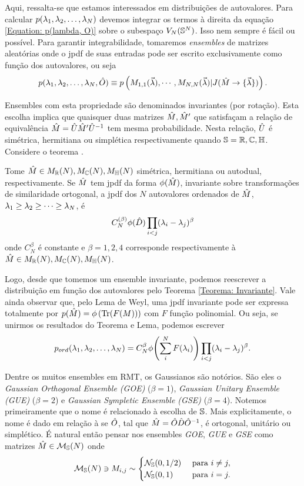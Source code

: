 \documentclass[12pt]{report}
\begin{document}
Aqui, ressalta-se que estamos interessados em distribuições de autovalores. Para calcular $p(\lambda_1, \lambda_2, \dots, \lambda_N)$ devemos integrar os termos à direita da equação \ref{Equation: p(lambda, O)} sobre o subespaço $V_N(\mathbb{S}^N)$. Isso nem sempre é fácil ou possível. Para garantir integrabilidade, tomaremos \textit{ensembles} de matrizes aleatórias onde o jpdf de suas entradas pode ser escrito exclusivamente como função dos autovalores, ou seja $$p(\lambda_1, \lambda_2, \dots, \lambda_N, \hat O) \equiv p \left( M_{1,1}(\vec{\lambda}), \cdots, M_{N,N}(\vec{\lambda}) | J(\hat M \rightarrow \{ \vec{\lambda} \} ) \right).$$

Ensembles com esta propriedade são denominados invariantes (por rotação). Esta escolha implica que quaisquer duas matrizes $\hat M, \hat M'$ que satisfaçam a relação de equivalência $\hat M = \hat U \hat M' \hat U^{-1}$ tem mesma probabilidade. Nesta relação, $\hat U$ é simétrica, hermitiana ou simplética respectivamente quando $\mathbb{S} = \mathbb{R},\mathbb{C},\mathbb{H} $. Considere o teorema \cite[Capítulo~3]{AlanThesis}.
\begin{thm}
	Tome $\hat M \in M_{\mathbb{R}}(N),  M_{\mathbb{C}}(N),  M_{\mathbb{H}}(N)$ simétrica, hermitiana ou autodual, respectivamente. Se  $\hat M$ tem jpdf da forma $\phi(\hat M)$, invariante sobre transformações de similaridade ortogonal, a jpdf dos $N$ autovalores ordenados de $\hat M$, $\lambda_1 \geq \lambda_2 \geq \dots \geq \lambda_N$, é $$ C_{N}^{(\beta)} \phi(\hat D) \prod_{i < j} (\lambda_i - \lambda_j)^{\beta}$$ onde $C_{N}^{\beta}$ é constante e $\beta = 1, 2, 4$ corresponde respectivamente à $\hat M \in M_{\mathbb{R}}(N),  M_{\mathbb{C}}(N),  M_{\mathbb{H}}(N)$. 
	\label{Teorema: Invariante}
\end{thm}
Logo, desde que tomemos um ensemble invariante, podemos reescrever a distribuição em função dos autovalores pelo Teorema \ref{Teorema: Invariante}. Vale ainda observar que, pelo Lema de Weyl, uma jpdf invariante pode ser expressa totalmente por $p(\hat M)= \phi \left(\operatorname{Tr}(F(M)) \right)$ com $F$ função polinomial. Ou seja, se unirmos os resultados do Teorema e Lema, podemos escrever
\begin{equation}
	p_{ord}(\lambda_1, \lambda_2, \dots, \lambda_N) = C_{N}^{\beta} \phi{\left( \sum_i^N F(\lambda_i) \right)} \prod_{i < j} (\lambda_i - \lambda_j)^{\beta}.
	\label{Equation: p-ord}
\end{equation}

Dentre os muitos ensembles em RMT, os Gaussianos são notórios. São eles o \textit{Gaussian Orthogonal Ensemble (GOE)} ($\beta=1$), \textit{Gaussian Unitary Ensemble (GUE)} ($\beta=2$) e \textit{Gaussian Sympletic Ensemble (GSE)} ($\beta=4$). Notemos primeiramente que o nome é relacionado à escolha de $\mathbb{S}$. Mais explicitamente, o nome é dado em relação à se $\hat O$, tal que $\hat M = \hat O\hat D\hat O^{-1}$, é ortogonal, unitário ou simplético. É natural então pensar nos ensembles \textit{GOE}, \textit{GUE} e \textit{GSE} como matrizes $\hat M \in \mathcal{M}_{\mathbb{S}}(N)$ onde 
$$
\mathcal{M}_{\mathbb{S}}(N) \ni M_{i,j} \sim
\begin{cases}
	\mathcal{N}_{\mathbb{S}}(0,1/2) &  \ \text{para} \ i \neq j,\\
	\mathcal{N}_{\mathbb{S}}(0,1) & \ \text{para} \ i = j.
\end{cases}
$$
\end{document}
